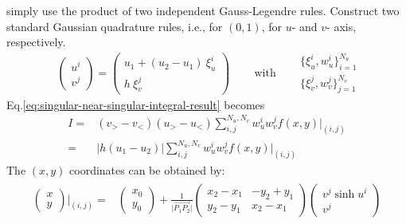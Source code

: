 \documentclass [10pt,letterpaper]{article}
\begin{document}
simply use the product of two independent Gauss-Legendre rules.
Construct two standard Gaussian quadrature rules, i.e., for $(0,1)$, for $u$- and $v$- axis, respectively.
\begin{equation} \label{eq:singular-near-singular-xiui-wui-xivj-wvj}
	\begin{split} 
		\begin{pmatrix}
			u^i					\\
			v^j
		\end{pmatrix}
		=
		\begin{pmatrix}
			u_1
			+ 
			\left( u_2 - u_1 \right)
			\ \xi_u^i				\\
			h
			\ \xi_v^j
		\end{pmatrix}
	\end{split}
	\ \ \ \ \ \ \ \ 
	\text{with}
	\ \ \ \ \ \ \ \ 
	\begin{split} 
		\{ \xi_u^i, w_u^i \}_{i=1}^{N_u}
		\\
		\{ \xi_v^j, w_v^j \}_{j=1}^{N_v}
	\end{split}
\end{equation}
Eq.\eqref{eq:singular-near-singular-integral-result} becomes
\begin{equation} \label{eq:singular-near-singular-general-quadrature}
	\begin{split} 
		I
		=& 
			(v_>-v_<)
			(u_>-u_<)
			\sum \nolimits_{i,j}^{N_u,N_v} 
			w_u^i w_v^j
			f(x,y)
			\big\vert
			_{ (i,j) }
		\\
		=&
			\lvert
				h
				\left( u_1 - u_2 \right)
			\rvert
			\sum \nolimits_{i,j}^{N_u,N_v} 
			w_u^i w_v^j
			f(x,y)
			\big\vert
			_{ (i,j) }
	\end{split}
\end{equation}
The $(x,y)$ coordinates can be obtained by:
\begin{subequations} \label{eq:singular-near-singular-x-y-ui-vj}
	\begin{align} 
		\begin{split} 
			\begin{pmatrix} 
				x					\\
				y
			\end{pmatrix}
			\bigg\vert _{ (i,j) }
			=& 
			\begin{pmatrix}
				x_0					\\
				y_0
			\end{pmatrix}
			+
			\frac{1}{\lvert \overrightarrow{P_1 P_2} \rvert}
			\begin{pmatrix} 
				x_2-x_1 	& 	-y_2+y_1	\\
				y_2-y_1 	& 	x_2-x_1		
			\end{pmatrix}
			\begin{pmatrix}
				v^j \sinh{u^i}				\\
				v^j
			\end{pmatrix}
		\end{split}
	\end{align}
\end{subequations}
\end{document}
